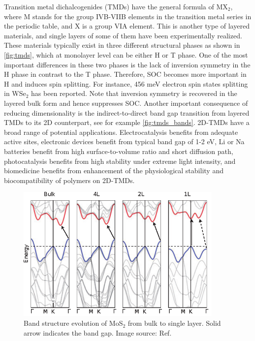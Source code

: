 Transition metal dichalcogenides (TMDs) have the general formula of MX$_2$, where M stands for the group IVB-VIIB elements in the transition metal series in the periodic table, and X is a group VIA element. This is another type of layered materials, and single layers of some of them have been experimentally realized.  These materials typically exist in three different structural phases as shown in \autoref{fig:tmds}, which at monolayer level can be either H or T phase. One of the most important differences in these two phases is the lack of inversion symmetry in the H phase in contrast to the T phase. Therefore, SOC becomes more important in H and induces spin splitting. For instance, 456 meV electron spin states splitting in WSe$_2$\cite{Zhu2011giant} has been reported. Note that inversion symmetry is recovered in the layered bulk form and hence suppresses SOC. Another important consequence of reducing dimensionality is the indirect-to-direct band gap transition from layered TMDs to its 2D counterpart, see for example \autoref{fig:tmds_bands}. 2D-TMDs have a broad range of potential applications. Electrocatalysis\cite{kim2013enhanced,huang2014synthesis} benefits from adequate active sites, electronic devices\cite{RadisavljevicB2011,sun2014fabrication} benefit from typical band gap of 1-2 eV, Li or Na batteries\cite{chang2011cysteine,chen2013situ} benefit from high surface-to-volume ratio and short diffusion path, photocatalysis benefits from high stability under extreme light intensity\cite{Li2013,Parzinger2015}, and biomedicine benefits from enhancement of the physiological stability and biocompatibility of polymers on 2D-TMDs\cite{Cheng2014,Yin2014}. 



\begin{figure}[htbp!] 
\centering  
\includegraphics[width=0.9\textwidth]{tmds_bands.eps}
\caption[Band structure evolution of MoS$_2$ from bulk to single layer]{Band structure evolution of MoS$_2$ from bulk to single layer. Solid arrow indicates the band gap. Image source: Ref. \cite{Chhowalla2013}}  
\label{fig:tmds_bands}
\end{figure} 


